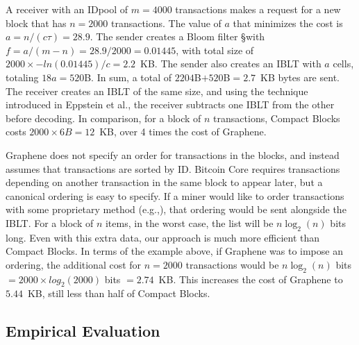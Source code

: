  A receiver with an IDpool of $m=4000$ transactions
makes a request for a new block that has $n=2000$ transactions. The
value of $a$ that minimizes the cost is $a=n/(c\tau)=28.9$. The sender
creates a Bloom filter \S with $f=a/(m-n)=28.9/2000= 0.01445$,
with total size of $2000\times -ln(0.01445)/c=2.2$~KB.  The
sender also creates an IBLT with $a$ cells, totaling $18a=520$B. In
sum, a total of $2204$B$+520$B$=2.7$~KB bytes are sent.  The receiver
creates an IBLT of the same size, and using the technique introduced
in Eppstein et al.\cite{eppstein:2011}, the receiver subtracts one
IBLT from the other before decoding. In comparison, for a block of $n$ transactions, Compact Blocks costs $2000\times6B = 12$~KB, over 4 times the cost of Graphene. 

 Graphene does not specify an order for transactions
in the blocks, and instead assumes that transactions are sorted by
ID. Bitcoin Core requires transactions depending on another transaction in
the same block to appear later, but a canonical ordering is easy to
specify. If a miner would like to order transactions with some
proprietary method (e.g.,\cite{Hanke:2016}), that ordering would be
sent alongside the IBLT. For a block of $n$ items, in the worst case,
the list will be $n\log_2(n)$ bits long.  Even with this extra data, our approach is much more efficient than Compact Blocks.   In terms of the example above, if Graphene was to impose an ordering, the additional cost for $n=2000$ transactions would be $n \log_2(n)$ bits $= 2000\times log_2(2000)$ bits $= 2.74$~KB. This increases the cost of Graphene to $5.44$~KB, still less than half of Compact Blocks.



\subsection{Empirical Evaluation}

